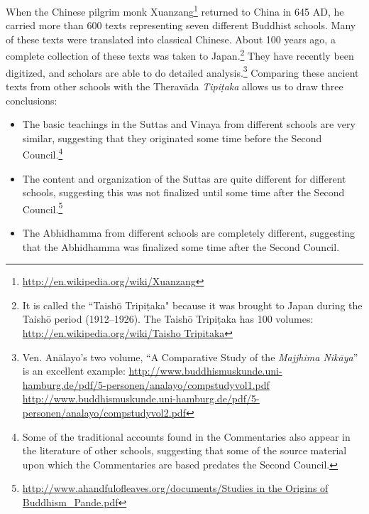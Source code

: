 When the Chinese pilgrim monk Xuanzang\footnote{\url{http://en.wikipedia.org/wiki/Xuanzang}} returned to China in 645 AD, he carried more than 600 texts representing seven different Buddhist schools. Many of these texts were translated into classical Chinese. About 100 years ago, a complete collection of these texts was taken to Japan.\footnote{It is called the “Taishō Tripiṭaka" because it was brought to Japan during the Taishō period (1912--1926). The Taishō Tripiṭaka has 100 volumes: \url{http://en.wikipedia.org/wiki/Taisho Tripitaka}} They have recently been digitized, and scholars are able to do detailed analysis.\footnote{Ven. Anālayo’s two volume, “A Comparative Study of the \textit{Majjhima Nikāya}” is an excellent example: \newline \url{http://www.buddhismuskunde.uni-hamburg.de/pdf/5-personen/analayo/compstudyvol1.pdf} \newline \url{http://www.buddhismuskunde.uni-hamburg.de/pdf/5-personen/analayo/compstudyvol2.pdf}} Comparing these ancient texts from other schools with the Theravāda \textit{Tipiṭaka} allows us to draw three conclusions:

\begin{itemize}

\item The basic teachings in the Suttas and Vinaya from different schools are very similar, suggesting that they originated some time before the Second Council.\footnote{Some of the traditional accounts found in the Commentaries also appear in the literature of other schools, suggesting that some of the source material upon which the Commentaries are based predates the Second Council.}

\item The content and organization of the Suttas are quite different for different schools, suggesting this was not finalized until some time after the Second Council.\footnote{\url{http://www.ahandfulofleaves.org/documents/Studies in the Origins of Buddhism_Pande.pdf}}

\item The Abhidhamma from different schools are completely different, suggesting that the Abhidhamma was finalized some time after the Second Council.

\end{itemize}

\pagebreak

